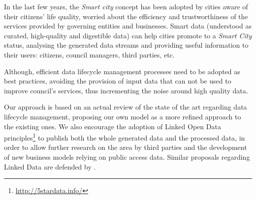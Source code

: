 In the last few years, the \textit{Smart city}  concept has been adopted by cities aware of their citizens' life quality, worried about the efficiency and trustworthiness of the services provided by governing entities and businesses. Smart data  (understood as curated, high-quality and digestible data) can help cities promote to a \textit{Smart City} status, analysing the generated data streams and providing useful information to their users: citizens, council managers, third parties, etc.

Although, efficient data lifecycle management processes need to be a\-dop\-ted as best practices, avoiding the provision of input data that can not be used to improve council's services, thus incrementing the noise around high quality data.

Our approach is based on an actual review of the state of the art regarding data lifecycle management, proposing our own model as a more refined approach to the existing ones. We also encourage the adoption of Linked Open Data principles\footnote{\url{http://5stardata.info/}} to publish both the whole generated data and the processed data, in order to allow further research on the area by third parties and the development of new business models relying on public access data. Similar proposals regarding Linked Data are defended by \cite{Bizer:2012:MUB:2094114.2094129}.
